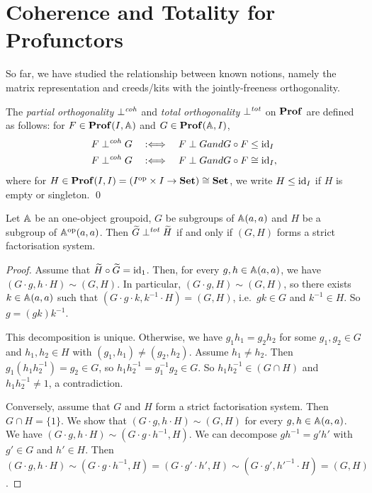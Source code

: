 \section{Coherence and Totality for Profunctors}
So far, we have studied the relationship between known notions, namely the matrix representation and creeds/kits with the jointly-freeness orthogonality.

\begin{definition}
    The \emph{partial orthogonality} \( \mathrel{\bot}^{\mathit{coh}} \) and \emph{total orthogonality} \( \mathrel{\bot}^{\mathit{tot}} \) on \( \mathbf{Prof} \) are defined as follows:
    for \( F \in \mathbf{Prof}(I, \mathbb{A}) \) and \( G \in \mathbf{Prof}(\mathbb{A}, I) \),
    \begin{align*}
        F \mathrel{\bot}^{\mathit{coh}} G &\quad:\Longleftrightarrow\quad F \mathrel{\bot} G \relax{ and } G \circ F \le \mathrm{id}_I \\ 
        F \mathrel{\bot}^{\mathit{coh}} G &\quad:\Longleftrightarrow\quad F \mathrel{\bot} G \relax{ and } G \circ F \cong \mathrm{id}_I,
    \end{align*}
    where for \( H \in \mathbf{Prof}(I,I) = (I^{\mathrm{op}} \times I \to \mathbf{Set}) \cong \mathbf{Set} \), we write \( H \le \mathrm{id}_I \) if \( H \) is empty or singleton.
    \qed
\end{definition}

\begin{proposition}
    Let \( \mathbb{A} \) be an one-object groupoid, \( G \) be subgroups of \( \mathbb{A}(a,a) \) and \( H \) be a subgroup of \( \mathbb{A}^{\mathrm{op}}(a,a) \).
    Then \( \widetilde{G} \mathrel{\bot}^{\mathit{tot}} \widetilde{H} \) if and only if \( (G, H) \) forms a strict factorisation system.
\end{proposition}
\begin{proof}
    Assume that \( \widetilde{H} \circ \widetilde{G} = \mathrm{id}_1 \).
    Then, for every \( g, h \in \mathbb{A}(a,a) \), we have \( (G \cdot g, h \cdot H) \sim (G, H) \).
    In particular, \( (G \cdot g, H) \sim (G, H) \), so there exists \( k \in \mathbb{A}(a,a) \) such that \( (G \cdot g \cdot k, k^{-1} \cdot H) = (G, H) \), i.e.~\( gk \in G \) and \( k^{-1} \in H \).
    So \( g = (gk) k^{-1} \).

    This decomposition is unique.
    Otherwise, we have \( g_1 h_1 = g_2 h_2 \) for some \( g_1, g_2 \in G \) and \( h_1, h_2 \in H \) with \( (g_1, h_1) \neq (g_2, h_2) \).
    Assume \( h_1 \neq h_2 \).
    Then \( g_1 (h_1 h_2^{-1}) = g_2 \in G \), so \( h_1 h_2^{-1} = g_1^{-1} g_2 \in G \).
    So \( h_1 h_2^{-1} \in (G \cap H) \) and \( h_1 h_2^{-1} \neq 1 \), a contradiction.

    Conversely, assume that \( G \) and \( H \) form a strict factorisation system.
    Then \( G \cap H = \{ 1 \} \).
    We show that \( (G \cdot g, h \cdot H) \sim (G, H) \) for every \( g, h \in \mathbb{A}(a,a) \).
    We have \( (G \cdot g, h \cdot H) \sim (G \cdot g \cdot h^{-1}, H) \).
    We can decompose \( g h^{-1} = g' h' \) with \( g' \in G \) and \( h' \in H \).
    Then \( (G \cdot g, h \cdot H) \sim (G \cdot g \cdot h^{-1}, H) = (G \cdot g' \cdot h', H) \sim (G \cdot g', h'^{-1} \cdot H) = (G, H) \).
\end{proof}

